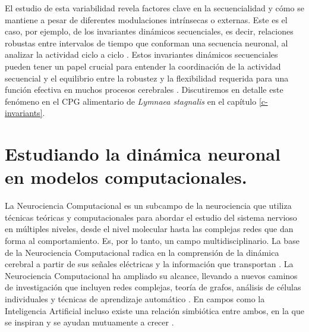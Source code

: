 El estudio de esta variabilidad revela factores clave en la secuencialidad y cómo se mantiene a pesar de diferentes modulaciones intrínsecas o externas. Este es el caso, por ejemplo, de los invariantes dinámicos secuenciales, es decir, relaciones robustas entre intervalos de tiempo que conforman una secuencia neuronal, al analizar la actividad ciclo a ciclo \parencite{reyes_artificial_2008,elices_robust_2019,garrido-pena_characterization_2021,berbel_emergence_2024}. Estos invariantes dinámicos secuenciales pueden tener un papel crucial para entender la coordinación de la actividad secuencial y el equilibrio entre la robustez y la flexibilidad requerida para una función efectiva en muchos procesos cerebrales \parencite{tatsuno_analysis_2015,ullen_neural_2003,zimnik_independent_2021,zhou_neural_2020,dragoi_cell_2020}. Discutiremos en detalle este fenómeno en el CPG alimentario de \textit{Lymnaea stagnalis} en el capítulo \ref{c-invariants}.\\


\section{Estudiando la dinámica neuronal en modelos computacionales.}
\label{sec:neurociencia_computacional}
La Neurociencia Computacional es un subcampo de la neurociencia que utiliza técnicas teóricas y computacionales para abordar el estudio del sistema nervioso en múltiples niveles, desde el nivel molecular hasta las complejas redes que dan forma al comportamiento. Es, por lo tanto, un campo multidisciplinario. La base de la Neurociencia Computacional radica en la comprensión de la dinámica cerebral a partir de sus señales eléctricas y la información que transportan \parencite{schwiening_brief_2012,catterall_hodgkin-huxley_2012,dimitrov_information_2011,shannon_mathematical_1948}. La Neurociencia Computacional ha ampliado su alcance, llevando a nuevos caminos de investigación que incluyen redes complejas, teoría de grafos, análisis de células individuales y técnicas de aprendizaje automático \parencite{cns2023}. En campos como la Inteligencia Artificial incluso existe una relación simbiótica entre ambos, en la que se inspiran y se ayudan mutuamente a crecer \parencite{amunts_human_2019,wozniak_deep_2020,goncalves_training_2020}.

